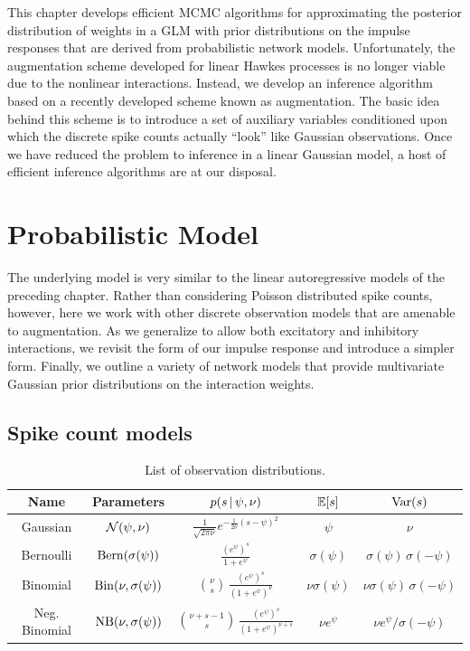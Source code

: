 This chapter develops efficient MCMC algorithms for approximating the
posterior distribution of weights in a GLM with prior distributions on
the impulse responses that are derived from probabilistic network
models.  Unfortunately, the augmentation scheme developed for linear
Hawkes processes is no longer viable due to the nonlinear
interactions. Instead, we develop an inference algorithm based on a
recently developed scheme known as \polyagamma augmentation. The basic
idea behind this scheme is to introduce a set of auxiliary variables
conditioned upon which the discrete spike counts actually ``look''
like Gaussian observations.  Once we have reduced the problem to
inference in a linear Gaussian model, a host of efficient inference
algorithms are at our disposal.


\section{Probabilistic Model}
The underlying model is very similar to the linear autoregressive 
models of the preceding chapter. Rather than considering Poisson 
distributed spike counts, however, here we work with other discrete 
observation models that are amenable to \polyagamma augmentation. 
As we generalize to allow both excitatory and inhibitory interactions, 
we revisit the form of our impulse response and introduce a simpler
form. Finally, we outline a variety of network models that provide 
multivariate Gaussian prior distributions on the interaction weights.

\subsection{Spike count models}

\begin{table}
\begin{center}
\begin{tabular}{c|c|c|c|c}
  \textbf{Name} & Parameters & $p(s \,|\, \psi, \nu)$ & $\mathbb{E}[s]$ & $\mathrm{Var}(s)$ \\
  \hline
  Gaussian 
  & $\mathcal{N}(\psi, \nu)$ 
  & $\frac{1}{\sqrt{2 \pi \nu}} e^{ -\frac{1}{2 \nu} (s - \psi)^2}$
  & $\psi$ & $\nu$ \\
  Bernoulli 
  & $\mathrm{Bern}(\sigma(\psi))$ 
  & $\frac{(e^\psi)^s}{1+e^\psi}$
  & $\sigma(\psi)$ & $\sigma(\psi) \, \sigma(-\psi)$ \\
  Binomial 
  & $\mathrm{Bin}(\nu, \sigma(\psi))$ 
  & ${\nu \choose s} \,\frac{(e^\psi)^s}{(1+e^\psi)^\nu}$
  & $\nu \sigma(\psi)$ & $\nu \sigma(\psi) \, \sigma(-\psi)$ \\
  Neg. Binomial 
  & $\mathrm{NB}(\nu, \sigma(\psi))$
  & ${\nu +s - 1 \choose s} \,\frac{(e^\psi)^s}{(1+e^\psi)^{\nu+s}}$
  & $\nu e^\psi$ & $\nu e^\psi / \sigma(-\psi)$ \\
\end{tabular}
\end{center}
\caption{List of observation distributions.}
\label{tab:obs_models}
\end{table}

